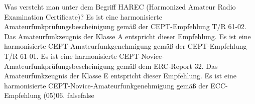     {Was versteht man unter dem Begriff HAREC (Harmonized Amateur Radio Examination Certificate)?}
    {Es ist eine harmonisierte Amateurfunkprüfungsbescheinigung gemäß der CEPT-Empfehlung T/R 61-02.
Das Amateurfunkzeugnis der Klasse A entspricht dieser Empfehlung.}
    {Es ist eine harmonisierte CEPT-Amateurfunkgenehmigung gemäß der CEPT-Empfehlung T/R 61-01.}
    {Es ist eine harmonisierte CEPT-Novice-Amateurfunkprüfungsbescheinigung gemäß dem ERC-Report 32. Das Amateurfunkzeugnis der Klasse E entspricht dieser Empfehlung.}
    {Es ist eine harmonisierte CEPT-Novice-Amateurfunkgenehmigung gemäß der ECC-Empfehlung (05)06.}
    {false}{false}